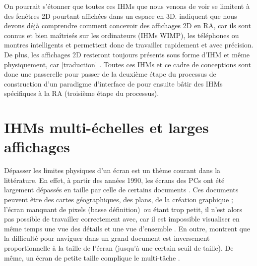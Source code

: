 
On pourrait s'étonner que toutes ces IHMs que nous venons de voir se limitent à des fenêtres 2D pourtant affichées dans un espace en 3D. \cite{Ens2014a} indiquent que nous devons déjà comprendre comment concevoir des affichages 2D en RA, car ils sont connus et bien maîtrisés sur les ordinateurs (IHMs WIMP), les téléphones ou montres intelligents et permettent donc de travailler rapidement et avec précision. De plus, les affichages 2D resteront toujours présents sous forme d'IHM et même physiquement, car [traduction]  \citep[p. 1]{Ens2014a}. Toutes ces IHMs et ce cadre de conceptions sont donc une passerelle pour passer de la deuxième étape du processus de construction d'un paradigme d'interface de \cite{Billinghurst2005} pour ensuite bâtir des IHMs spécifiques à la RA (troisième étape du processus).


\section{IHMs multi-échelles et larges affichages}
\label{sec:litterature_multiscale_displays}


Dépasser les limites physiques d'un écran est un thème courant dans la littérature. En effet, à partir des années 1990, les écrans des PCs ont été largement dépassés en taille par celle de certains documents \citep{Guiard2004}. Ces documents peuvent être des cartes géographiques, des plans, de la création graphique ; l'écran manquant de pixels (basse définition)\footnotemark\ ou étant trop petit, il n'est alors pas possible de travailler correctement avec, car il est impossible visualiser en même temps une vue des détails et une vue d'ensemble . En outre, \cite{Guiard2004} montrent que la difficulté pour naviguer dans un grand document est inversement proportionnelle à la taille de l'écran (jusqu'à une certain seuil de taille). De même, un écran de petite taille complique le multi-tâche \citep{Ens2014}.

